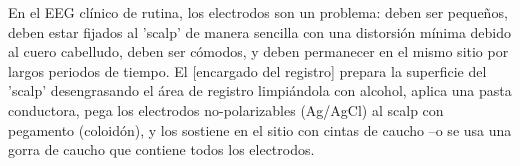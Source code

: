 
En el EEG cl\'inico de rutina, los electrodos son un problema: deben ser peque\~nos, deben estar
fijados al 'scalp' de manera sencilla con una distorsi\'on m\'inima debido al cuero cabelludo,
deben ser c\'omodos, y deben permanecer en el mismo sitio por largos periodos de tiempo.
El [encargado del registro] prepara la superficie del 'scalp' desengrasando el \'area de registro
limpi\'andola con alcohol, aplica una pasta conductora, pega los electrodos no-polarizables (Ag/AgCl)
al scalp con pegamento (coloid\'on), y los sostiene en el sitio con cintas de caucho
--o se usa una gorra de caucho que contiene todos los electrodos.


